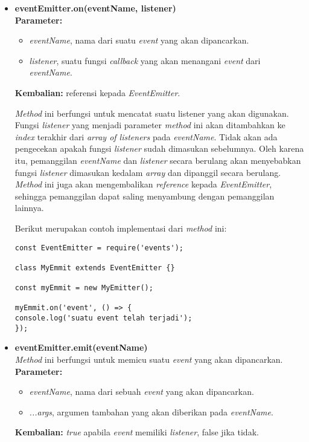 \begin{itemize}
	\item \textbf{eventEmitter.on(eventName, listener)} \\ \textbf{Parameter:}
	\begin{itemize}
		\item \textit{eventName}, nama dari suatu \textit{event} yang akan dipancarkan.
		\item \textit{listener}, suatu fungsi \textit{callback} yang akan menangani \textit{event} dari \textit{eventName}. 
	\end{itemize} 
	\textbf{Kembalian:} referensi kepada \textit{EventEmitter}.
	
	\textit{Method} ini berfungsi untuk mencatat suatu listener yang akan digunakan. Fungsi \textit{listener} yang menjadi parameter \textit{method} ini akan ditambahkan ke \textit{index} terakhir dari \textit{array of listeners} pada \textit{eventName}. Tidak akan ada pengecekan apakah fungsi \textit{listener} sudah dimasukan sebelumnya. Oleh karena itu, pemanggilan \textit{eventName} dan \textit{listener} secara berulang akan menyebabkan fungsi \textit{listener} dimasukan kedalam \textit{array} dan dipanggil secara berulang. \textit{Method} ini juga akan mengembalikan \textit{reference} kepada \textit{EventEmitter}, sehingga pemanggilan dapat saling menyambung dengan pemanggilan lainnya.
	
	Berikut merupakan contoh implementasi dari \textit{method} ini:
\begin{lstlisting}
const EventEmitter = require('events');
	
class MyEmmit extends EventEmitter {}
	
const myEmmit = new MyEmitter();
	
myEmmit.on('event', () => {
console.log('suatu event telah terjadi');	
});
\end{lstlisting}
	
	\item \textbf{eventEmitter.emit(eventName)} \\ \textit{Method} ini berfungsi untuk memicu suatu \textit{event} yang akan dipancarkan. \textbf{Parameter:}
	\begin{itemize}
		\item \textit{eventName}, nama dari sebuah \textit{event} yang akan dipancarkan.
		\item \textit{...args}, argumen tambahan yang akan diberikan pada \textit{eventName}. 
	\end{itemize}
	\textbf{Kembalian:} \textit{true} apabila \textit{event} memiliki \textit{listener}, false jika tidak.
	

\end{itemize}
